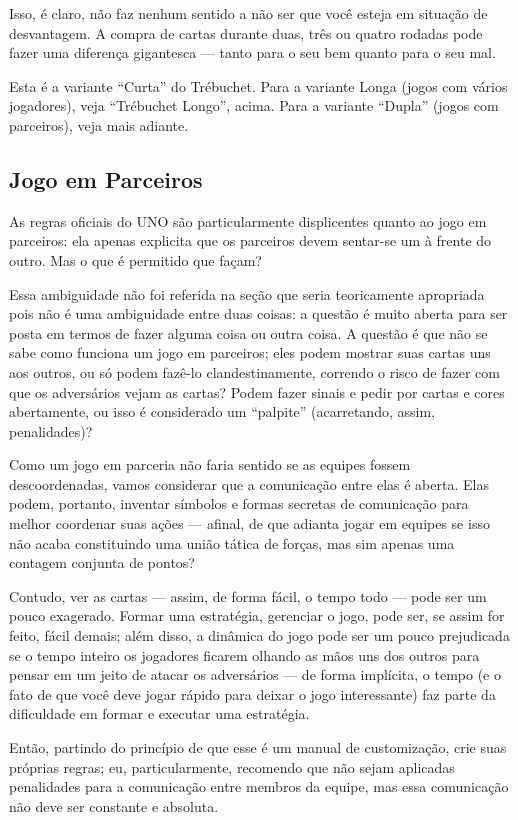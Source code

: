 Isso, é claro, não faz nenhum sentido a não ser que você esteja em situação de desvantagem. A compra de cartas durante duas, três ou quatro rodadas pode fazer uma diferença gigantesca --- tanto para o seu bem quanto para o seu mal.

Esta é a variante ``Curta'' do Trébuchet. Para a variante Longa (jogos com vários jogadores), veja ``Trébuchet Longo'', acima. Para a variante ``Dupla'' (jogos com parceiros), veja mais adiante.

\subsection{Jogo em Parceiros}

As regras oficiais do UNO são particularmente displicentes quanto ao jogo em parceiros: ela apenas explicita que os parceiros devem sentar-se um à frente do outro. Mas o que é permitido que façam?

Essa ambiguidade não foi referida na seção que seria teoricamente apropriada pois não é uma ambiguidade entre duas coisas: a questão é muito aberta para ser posta em termos de fazer alguma coisa ou outra coisa. A questão é que não se sabe como funciona um jogo em parceiros; eles podem mostrar suas cartas uns aos outros, ou só podem fazê-lo clandestinamente, correndo o risco de fazer com que os adversários vejam as cartas? Podem fazer sinais e pedir por cartas e cores abertamente, ou isso é considerado um ``palpite'' (acarretando, assim, penalidades)?

Como um jogo em parceria não faria sentido se as equipes fossem descoordenadas, vamos considerar que a comunicação entre elas é aberta. Elas podem, portanto, inventar símbolos e formas secretas de comunicação para melhor coordenar suas ações --- afinal, de que adianta jogar em equipes se isso não acaba constituindo uma união tática de forças, mas sim apenas uma contagem conjunta de pontos?

Contudo, ver as cartas --- assim, de forma fácil, o tempo todo --- pode ser um pouco exagerado. Formar uma estratégia, gerenciar o jogo, pode ser, se assim for feito, fácil demais; além disso, a dinâmica do jogo pode ser um pouco prejudicada se o tempo inteiro os jogadores ficarem olhando as mãos uns dos outros para pensar em um jeito de atacar os adversários --- de forma implícita, o tempo (e o fato de que você deve jogar rápido para deixar o jogo interessante) faz parte da dificuldade em formar e executar uma estratégia.

Então, partindo do princípio de que esse é um manual de customização, crie suas próprias regras; eu, particularmente, recomendo que não sejam aplicadas penalidades para a comunicação entre membros da equipe, mas essa comunicação não deve ser constante e absoluta.

